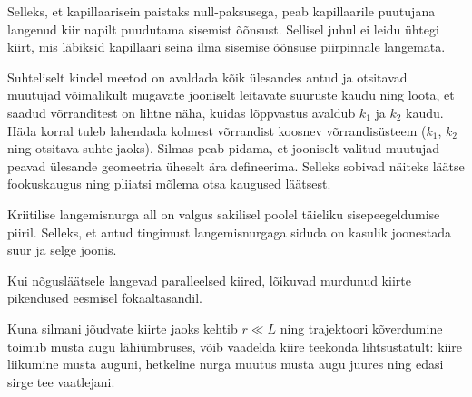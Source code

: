 \documentclass[10pt]{article}
\begin{document}
{
\hint
Selleks, et kapillaarisein paistaks null-paksusega, peab kapillaarile puutujana langenud kiir napilt puudutama sisemist õõnsust. Sellisel juhul ei leidu ühtegi kiirt, mis läbiksid kapillaari seina ilma sisemise õõnsuse piirpinnale langemata.
\probend
\bigskip


\hint
Suhteliselt kindel meetod on avaldada kõik ülesandes antud ja otsitavad muutujad võimalikult mugavate jooniselt leitavate suuruste kaudu ning loota, et saadud võrranditest on lihtne näha, kuidas lõppvastus avaldub $k_1$ ja $k_2$ kaudu. Häda korral tuleb lahendada kolmest võrrandist koosnev võrrandisüsteem ($k_1$, $k_2$ ning otsitava suhte jaoks). Silmas peab pidama, et jooniselt valitud muutujad peavad ülesande geomeetria üheselt ära defineerima. Selleks sobivad näiteks läätse fookuskaugus ning pliiatsi mõlema otsa kaugused läätsest.
\probend
\bigskip


\hint
Kriitilise langemisnurga all on valgus sakilisel poolel täieliku sisepeegeldumise piiril. Selleks, et antud tingimust langemisnurgaga siduda on kasulik joonestada suur ja selge joonis.
\probend
\bigskip


\hint
Kui nõgusläätsele langevad paralleelsed kiired, lõikuvad
murdunud kiirte pikendused eesmisel fokaaltasandil.
\probend
\bigskip


\hint
Kuna silmani jõudvate kiirte jaoks kehtib $r \ll L$ ning trajektoori kõverdumine toimub musta augu lähiümbruses, võib vaadelda kiire teekonda lihtsustatult: kiire liikumine musta auguni, hetkeline nurga muutus musta augu juures ning edasi sirge tee vaatlejani.
\probend
\bigskip


}
\end{document}

